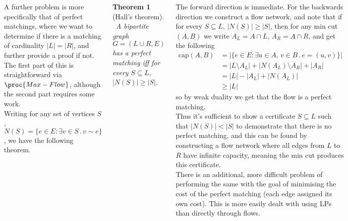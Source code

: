 \documentclass{tikzposter} %
\newtheorem{theorem}{Theorem}
\newtheorem{definition}{Definition}
\begin{document}
\begin{columns}
{{  A further problem is more specifically that of perfect matchings, where we want to determine if there is a matching of cardinality $|L| = |R|$, and further provide a proof if not. The first part of this is straightforward via $\proc{Max-Flow}$, although the second part requires some work. \\

  Writing for any set of vertices $S$, $N(S) = \{e \in E : \exists v \in S \,.\, v \sim e\}$, we have the following theorem. \\

  \begin{theorem}[Hall's theorem]
  \ A bipartite graph $G = (L \cup R, E)$ has a perfect matching iff for every $S \subseteq L$, $|N(S)| \ge |S|$.
  \end{theorem}
  \hphantom{}

  The forward direction is immediate. For the backwards direction we construct a flow network, and note that if for every $S \subseteq L$, $|N(S)| \ge |S|$, then for any min cut $(A,B)$ we write $A_{L} = A \cap L$, $A_{R} = A \cap R$, and get the following
  \begin{align*}
    \mathrm{cap}(A,B) &= |\{e \in E : \exists u \in A,\,v \in B\,.\, e = (u,v)\}| \\
                      &= |L\setminus A_{L}| + |N(A_{L}) \setminus A_{R}| +  |A_{R}| \\
                      &= |L| - |A_{L}| + |N(A_{L})| \\
    &\ge |L|
  \end{align*}
  so by weak duality we get that the flow is a perfect matching. \\

  Thus it's sufficient to show a certificate $S \subseteq L$ such that $|N(S)| < |S|$ to demonstrate that there is no perfect matching, and this can be found by constructing a flow network where all edges from $L$ to $R$ have infinite capacity, meaning the min cut produces this certificate. \\

  There is an additional, more difficult problem of performing the same with the goal of minimising the cost of the perfect matching (each edge assigned its own cost). This is more easily dealt with using LPs than directly through flows.
  }
}


\end{columns}
\end{document}
